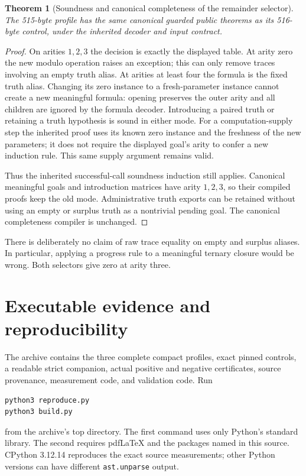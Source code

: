 \documentclass[11pt]{article}
\newtheorem{theorem}{Theorem}[section]
\theoremstyle{definition}
\theoremstyle{remark}
\begin{document}
\begin{theorem}[Soundness and canonical completeness of the remainder selector]
The 515-byte profile has the same canonical guarded public theorems as
its 516-byte control, under the inherited decoder and input contract.
\end{theorem}
\begin{proof}
On arities $1,2,3$ the decision is exactly the displayed table.
At arity zero the new modulo operation raises an exception; this can
only remove traces involving an empty truth alias.  At arities at least
four the formula is the fixed truth alias.  Changing its zero instance
to a fresh-parameter instance cannot create a new meaningful formula:
opening preserves the outer arity and all children are ignored by the
formula decoder.  Introducing a paired truth or retaining a truth
hypothesis is sound in either mode.  For a computation-supply step the
inherited proof uses its known zero instance and the freshness of the
new parameters; it does not require the displayed goal's arity to confer
a new induction rule.  This same supply argument remains valid.

Thus the inherited successful-call soundness induction still applies.
Canonical meaningful goals and introduction matrices have arity $1,2,3$,
so their compiled proofs keep the old mode.  Administrative truth exports
can be retained without using an empty or surplus truth as a nontrivial
pending goal.  The canonical completeness compiler is unchanged.
\end{proof}

There is deliberately no claim of raw trace equality on empty and surplus
aliases.  In particular, applying a progress rule to a meaningful ternary
closure would be wrong.  Both selectors give zero at arity three.



\section{Executable evidence and reproducibility}

The archive contains the three complete compact profiles, exact pinned
controls, a readable strict companion, actual positive and negative
certificates, source provenance, measurement code, and validation code.
Run
\begin{lstlisting}[language={}]
python3 reproduce.py
python3 build.py
\end{lstlisting}
from the archive's top directory.  The first command uses only Python's
standard library.  The second requires pdfLaTeX and the packages named
in this source.  CPython 3.12.14 reproduces the exact source measurements;
other Python versions can have different \texttt{ast.unparse} output.
\end{document}
